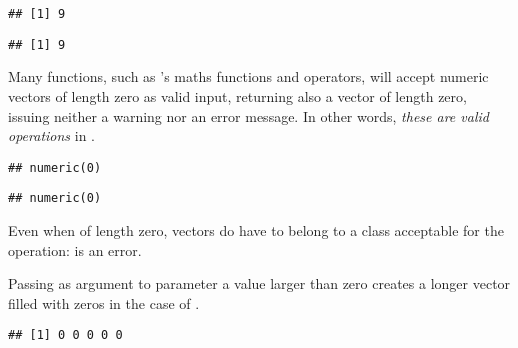 \documentclass[krantz2]{krantz}\usepackage{knitr}
\begin{document}
\begin{explainbox}
\begin{knitrout}\footnotesize
{}\color{fgcolor}\begin{kframe}
\begin{alltt}
\hlstd{(} \hlstd{(}
\end{alltt}
\begin{verbatim}
## [1] 9
\end{verbatim}
\begin{alltt}
\hlstd{(}
\end{alltt}
\begin{verbatim}
## [1] 9
\end{verbatim}
\end{kframe}
\end{knitrout}

Many functions, such as \Rlang's maths functions and operators, will accept numeric vectors of length zero as valid input, returning also a vector of length zero, issuing neither a warning nor an error message. In other words, \emph{these are valid operations} in \Rlang.

\begin{knitrout}\footnotesize
{}\color{fgcolor}\begin{kframe}
\begin{alltt}
\hlstd{(}\hlstd{(}\hlstd{))}
\end{alltt}
\begin{verbatim}
## numeric(0)
\end{verbatim}
\begin{alltt}
 \hlopt{+} \hlstd{(}\hlstd{)}
\end{alltt}
\begin{verbatim}
## numeric(0)
\end{verbatim}
\end{kframe}
\end{knitrout}

Even when of length zero, vectors do have to belong to a class acceptable for the operation:  is an error.

Passing as argument to parameter  a value larger than zero creates a longer vector filled with zeros in the case of .

\begin{knitrout}\footnotesize
{}\color{fgcolor}\begin{kframe}
\begin{alltt}
\hlstd{(}\hlstd{)}
\end{alltt}
\begin{verbatim}
## [1] 0 0 0 0 0
\end{verbatim}
\end{kframe}
\end{knitrout}


\end{explainbox}
\end{document}
